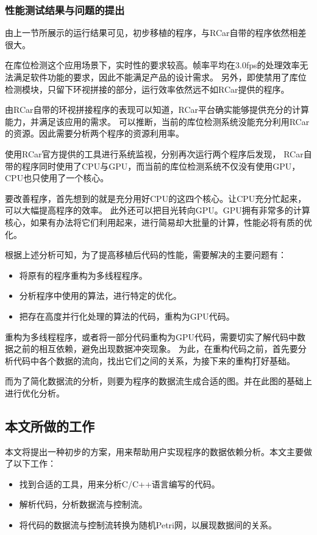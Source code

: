 \subsubsection{性能测试结果与问题的提出}
由上一节所展示的运行结果可见，初步移植的程序，与RCar自带的程序依然相差很大。

在库位检测这个应用场景下，实时性的要求较高。帧率平均在3.0fps的处理效率无法满足软件功能的要求，因此不能满足产品的设计需求。
另外，即使禁用了库位检测模块，只留下环视拼接的部分，运行效率依然远不如RCar提供的程序。

由RCar自带的环视拼接程序的表现可以知道，RCar平台确实能够提供充分的计算能力，并满足该应用的需求。
可以推断，当前的库位检测系统没能充分利用RCar的资源。因此需要分析两个程序的资源利用率。

使用RCar官方提供的工具进行系统监视，分别再次运行两个程序后发现，
RCar自带的程序同时使用了CPU与GPU，而当前的库位检测系统不仅没有使用GPU，CPU也只使用了一个核心。

要改善程序，首先想到的就是充分用好CPU的这四个核心。让CPU充分忙起来，可以大幅提高程序的效率。
此外还可以把目光转向GPU。GPU拥有非常多的计算核心，如果有办法将它们利用起来，进行简易却大批量的计算，性能必将有质的优化。

根据上述分析可知，为了提高移植后代码的性能，需要解决的主要问题有：

{
\begin{itemize}
    \addtolength{\itemindent}{2.5em}
    \item 将原有的程序重构为多线程程序。
    \item 分析程序中使用的算法，进行特定的优化。
    \item 把存在高度并行化处理的算法的代码，重构为GPU代码。
\end{itemize}
}

重构为多线程程序，或者将一部分代码重构为GPU代码，需要切实了解代码中数据之前的相互依赖，避免出现数据冲突现象。
为此，在重构代码之前，首先要分析代码中各个数据的流向，找出它们之间的关系，为接下来的重构打好基础。

而为了简化数据流的分析，则要为程序的数据流生成合适的图。并在此图的基础上进行优化分析。

\subsection{本文所做的工作}
本文将提出一种初步的方案，用来帮助用户实现程序的数据依赖分析。本文主要做了以下工作：

{
\begin{itemize}
    \addtolength{\itemindent}{2.5em}
    \item 找到合适的工具，用来分析C/C++语言编写的代码。
    \item 解析代码，分析数据流与控制流。
    \item 将代码的数据流与控制流转换为随机Petri网，以展现数据间的关系。
\end{itemize}
}
